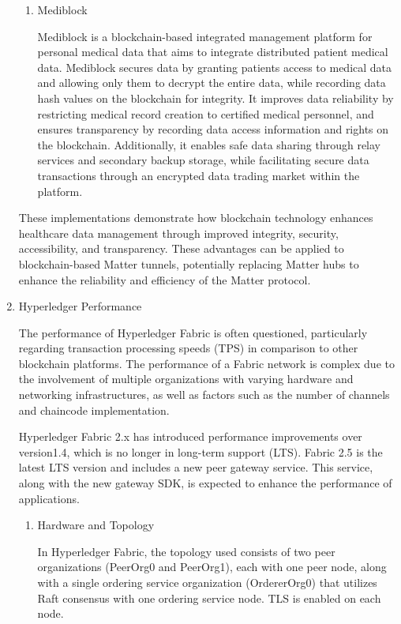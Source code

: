 \documentclass[conference]{IEEEtran}
\begin{document}
\begin{enumerate}[itemsep=2ex, parsep=1ex]
\begin{enumerate}[itemsep=2ex, parsep=1ex]
				\item Mediblock

					Mediblock is a blockchain-based integrated management platform for personal medical data that aims to integrate distributed patient medical data. Mediblock secures data by granting patients access to medical data and allowing only them to decrypt the entire data, while recording data hash values on the blockchain for integrity. It improves data reliability by restricting medical record creation to certified medical personnel, and ensures transparency by recording data access information and rights on the blockchain. Additionally, it enables safe data sharing through relay services and secondary backup storage, while facilitating secure data transactions through an encrypted data trading market within the platform.
			\end{enumerate}

			These implementations demonstrate how blockchain technology enhances healthcare data management through improved integrity, security, accessibility, and transparency. These advantages can be applied to blockchain-based Matter tunnels, potentially replacing Matter hubs to enhance the reliability and efficiency of the Matter protocol.

		\item Hyperledger Performance

			The performance of Hyperledger Fabric is often questioned, particularly regarding
			transaction processing speeds (TPS) in comparison to other blockchain platforms.
			The performance of a Fabric network is complex due to the involvement of
			multiple organizations with varying hardware and networking
			infrastructures, as well as factors such as the number of channels and chaincode
			implementation.

			Hyperledger Fabric 2.x has introduced performance improvements over
			version1.4, which is no longer in long-term support (LTS). Fabric 2.5 is the
			latest LTS version and includes a new peer gateway service. This service, along
			with the new gateway SDK, is expected to enhance the performance of
			applications.

			\begin{enumerate}[itemsep=2ex, parsep=1ex]
				\item Hardware and Topology

					In Hyperledger Fabric, the topology used consists of two peer organizations
					(PeerOrg0 and PeerOrg1), each with one peer node, along with a single ordering
					service organization (OrdererOrg0) that utilizes Raft consensus with one
					ordering service node. TLS is enabled on each node.


\end{enumerate}
\end{enumerate}
\end{document}
